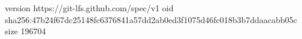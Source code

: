 version https://git-lfs.github.com/spec/v1
oid sha256:47b24f67dc25148fc6376841a57dd2ab0ed3f1075d46fc018b3b7ddaacabb05c
size 196704
